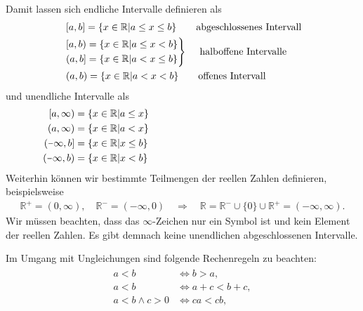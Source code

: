 Damit lassen sich endliche Intervalle definieren als 
\begin{align}
    \begin{split}
        &\;[a,b] = \{x \in\mathbb{R} | a \le x \le b\} \qquad \text{abgeschlossenes Intervall} \\
        &\begin{rcases}
            [a,b) = \{x \in\mathbb{R} | a \le x < b\} \\
            (a,b] = \{x \in\mathbb{R} | a < x \le b\}   
        \end{rcases} \quad\;\text{halboffene Intervalle} \\
        &\;(a,b) = \{x \in\mathbb{R} | a < x < b\} \qquad \text{offenes Intervall} \\
    \end{split}
\end{align}
und unendliche Intervalle als 
\begin{align}
    \begin{split}
        [a,\infty) &= \{x\in\mathbb{R}| a \le x\} \hspace{6.2cm}\\
        (a,\infty) &= \{x\in\mathbb{R}| a < x\} \\
        (\minus\infty,b] &= \{x\in\mathbb{R}| x \le b\} \\
        (\minus\infty,b) &= \{x\in\mathbb{R}| x < b\}
    \end{split}
\end{align}
Weiterhin können wir bestimmte Teilmengen der reellen Zahlen definieren, beispielsweise 
\begin{align}
    \mathbb{R}^+ = (0,\infty), \quad \mathbb{R}^- = (\minus\infty,0) \quad \Rightarrow \quad \mathbb{R} = \mathbb{R}^- \cup \{0\} \cup \mathbb{R}^+ = (\minus\infty,\infty).
\end{align}
Wir müssen beachten, dass das $\infty$-Zeichen nur ein Symbol ist und kein Element der reellen Zahlen. Es gibt demnach keine unendlichen abgeschlossenen Intervalle.

Im Umgang mit Ungleichungen sind folgende Rechenregeln zu beachten: 
\begin{align}
    \begin{split}
        a < b &\Longleftrightarrow b>a, \\
        a < b &\Longleftrightarrow a+c < b+c,\\
        a < b \wedge c > 0 &\Longleftrightarrow ca < cb, 
    \end{split}
\end{align}